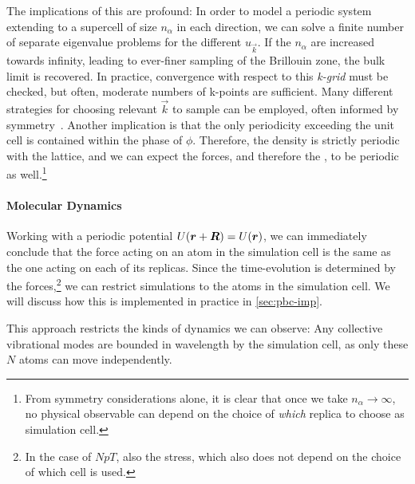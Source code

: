The implications of this are profound: In order to model a periodic system extending to a supercell of size $n_\alpha$ in each direction, we can solve a finite number of separate eigenvalue problems for the different $u_{\vec{k}}$. 
If the $n_\alpha$ are increased towards infinity, leading to ever-finer sampling of the Brillouin zone, the bulk limit is recovered. In practice, convergence with respect to this \emph{k-grid} must be checked, but often, moderate numbers of k-points are sufficient. Many different strategies for choosing relevant $\vec{k}$ to sample can be employed, often informed by symmetry~\cite{cc1973p,mp1976p}.
Another implication is that the only periodicity exceeding the unit cell is contained within the phase of $\phi$. Therefore, the density is strictly periodic with the lattice, and we can expect the forces, and therefore the \bo \pes, to be periodic as well.\footnote{From symmetry considerations alone, it is clear that once we take $n_\alpha \rightarrow \infty$, no physical observable can depend on the choice of \emph{which} replica to choose as simulation cell.}

\paragraph{Molecular Dynamics} Working with a periodic potential $U(\boldsymbol{r} + \boldsymbol{R}) = U(\boldsymbol{r})$, we can immediately conclude that the force acting on an atom in the simulation cell is the same as the one acting on each of its replicas. Since the time-evolution is determined by the forces,\footnote{In the case of $NpT$, also the stress, which also does not depend on the choice of which cell is used.} we can restrict \md simulations to the atoms in the simulation cell. We will discuss how this is implemented in practice in \cref{sec:pbc-imp}.

This approach restricts the kinds of dynamics we can observe: Any collective vibrational modes are bounded in wavelength by the simulation cell, as only these $N$ atoms can move independently.

